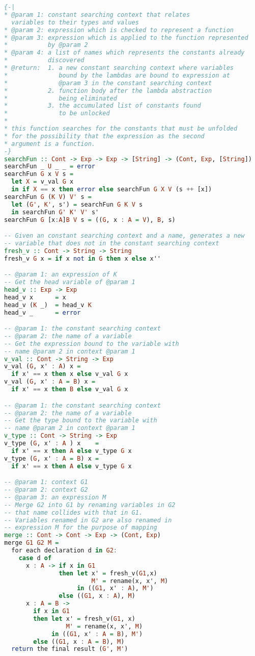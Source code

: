 \begin{lstlisting}[language=Haskell, caption={Approximation Algorithm For Minimum Set of Constants}, label={theory:alg:minimum}]
{-|
* @param 1: constant searching context that relates
  variables to their types and values 
* @param 2: expression which is checked to represent a function
* @param 3: expression which is applied to the function represented
*           by @param 2
* @param 4: a list of names which represents the constants already
*           discovered
* @return:  1. a new constant searching context where variables
*              bound by the lambdas are bound to expression at
*              @param 3 in the constant searching context
*           2. function body after the lambda abstraction
*              being eliminated
*           3. the accumulated list of constants found
*              to be unlocked
*
* this function searches for the constants that must be unfolded
* for the possibility that the expression as the second
* argument is a function.
-}
searchFun :: Cont -> Exp -> Exp -> [String] -> (Cont, Exp, [String])
searchFun _ U _ _ = error
searchFun G x V s =
  let X = v_val G x
  in if X == x then error else searchFun G X V (s ++ [x]) 
searchFun G (K V) V' s =
  let (G', K', s') = searchFun G K V s
  in searchFun G' K' V' s'
searchFun G [x:A]B V s = ((G, x : A = V), B, s)

-- Given an constant searching context and a name, generates a new
-- variable that does not in the constant searching context  
fresh_v :: Cont -> String -> String 
fresh_v G x = if x not in G then x else x''

-- @param 1: an expression of K
-- Get the head variable of @param 1
head_v :: Exp -> Exp
head_v x      = x
head_v (K _)  = head_v K
head_v _      = error

-- @param 1: the constant searching context
-- @param 2: the name of a variable
-- Get the expression bound to the variable with
-- name @param 2 in context @param 1
v_val :: Cont -> String -> Exp
v_val (G, x' : A) x =
  if x' == x then x else v_val G x
v_val (G, x' : A = B) x = 
  if x' == x then B else v_val G x

-- @param 1: the constant searching context
-- @param 2: the name of a variable
-- Get the type bound to the variable with
-- name @param 2 in context @param 1
v_type :: Cont -> String -> Exp
v_type (G, x' : A ) x    =
  if x' == x then A else v_type G x
v_type (G, x' : A = B) x = 
  if x' == x then A else v_type G x

-- @param 1: context G1
-- @param 2: context G2
-- @param 3: an expression M
-- Merge G2 into G1 by renaming variables in G2
-- that name collides with that in G1.
-- Variables renamed in G2 are also renamed in
-- expression M for the purpose of mapping
merge :: Cont -> Cont -> Exp -> (Cont, Exp)
merge G1 G2 M =
  for each declaration d in G2:
    case d of
      x : A -> if x in G1 
               then let x' = fresh_v(G1,x)
                        M' = rename(x, x', M)
                    in ((G1, x' : A), M')
               else ((G1, x : A), M)
      x : A = B ->              
        if x in G1
        then let x' = fresh_v(G1, x)
                 M' = rename(x, x', M)
             in ((G1, x' : A = B), M')
        else ((G1, x : A = B), M)
  return the final result (G', M')


\end{lstlisting}
